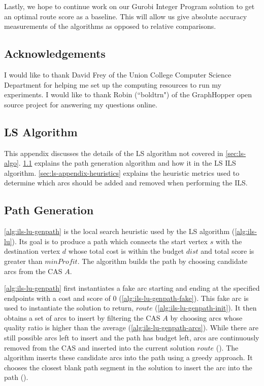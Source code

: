 \documentclass[honors]{union-cs-thesis}
\begin{document}
Lastly, we hope to continue work on our Gurobi Integer Program solution to get an optimal route score as a baseline. This will allow us give absolute accuracy measurements of the algorithms as opposed to relative comparisons.

\subsection{Acknowledgements}
I would like to thank David Frey of the Union College Computer Science Department for helping me set up the computing resources to run my experiments. I would like to thank Robin (``boldtrn") of the GraphHopper open source project for answering my questions online.   


\begin{appendices}

\section{LS Algorithm}
This appendix discusses the details of the LS algorithm not covered in \cref{sec:ls-algo}. \cref{sec:ls-appendix-path} explains the path generation algorithm and how it in the LS ILS algorithm. \cref{sec:ls-appendix-heuristics} explains the heuristic metrics used to determine which arcs should be added and removed when performing the ILS.
\subsection{Path Generation}
\label{sec:ls-appendix-path}
\cref{alg:ils-lu-genpath} is the local search heuristic used by the LS algorithm (\cref{alg:ils-lu}). Its goal is to produce a path which connects the start vertex $s$ with the destination vertex $d$ whose total cost is within the budget $dist$ and total score is greater than $minProfit$. The algorithm builds the path by choosing candidate arcs from the CAS $A$.

\cref{alg:ils-lu-genpath} first instantiates a fake arc starting and ending at the specified endpoints with a cost and score of 0 (\cref{alg:ils-lu-genpath-fake}). This fake arc is used to instantiate the solution to return, $route$ (\cref{alg:ils-lu-genpath-init}). It then obtains a set of arcs to insert by filtering the CAS $A$ by choosing arcs whose quality ratio is higher than the average (\cref{alg:ils-lu-genpath-arcs}). While there are still possible arcs left to insert and the path has budget left, arcs are continuously removed from the CAS and inserted into the current solution $route$ (). The algorithm inserts these candidate arcs into the path using a greedy approach. It chooses the closest blank path segment in the solution to insert the arc into the path ().



\end{appendices}
\end{document}
